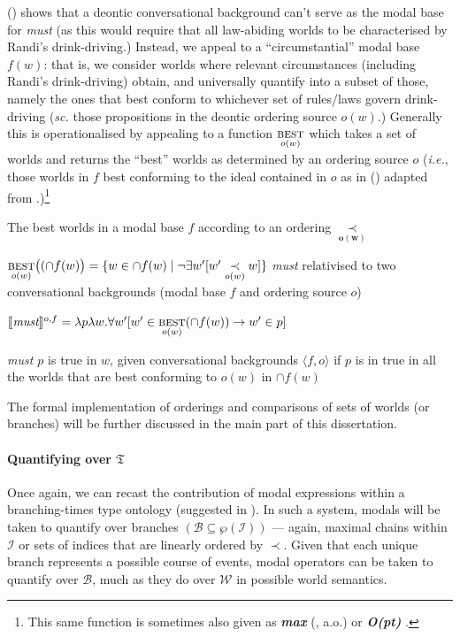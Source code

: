 \documentclass[12pt,dvipsnames]{report}
\providecommand{\denote}[2][]{\ensuremath{\llbracket{#2}\rrbracket^{#1}}}
\begin{document}
\noindent(\lastx) shows that a deontic conversational background can't serve as the modal base for \textit{must} (as this would require that all law-abiding worlds to be characterised by Randi's drink-driving.) Instead, we appeal to a ``circumstantial'' modal base $ f(w) $: that is, we consider worlds where relevant circumstances (including Randi's drink-driving) obtain, and universally quantify into a subset of those, namely the ones that best conform to whichever set of rules/laws govern drink-driving (\textit{sc.} those propositions in the deontic ordering source $ o(w) $.) Generally this is operationalised by appealing to a function $ \underset{o(w)}{\textsc{best}}$ which takes a set of worlds and returns the ``best'' worlds as determined by an ordering source $ o $ (\textit{i.e.}, those worlds in $ f $ best conforming to the ideal contained in $ o $ as in (\nextx) adapted from \citealp[61]{VonFintel2011}.)\footnote{This same function is sometimes also given as \textbf{\textit{max}} (\citealp[e.g.][]{Hacquard2006,VonFintel2008,VonFintel2011}, a.o.) or \textbf{\textit{O(pt)}} \citep[247]{Schwager2006}.} 

\ex The best worlds in a modal base $ f $ according to an ordering $\boldsymbol{\underset{o(w)}{\prec}}$

$ \underset{o(w)}{\textsc{best}}\big((\cap f(w)\big)=\{w\in\cap f(w)\mid \neg\exists w'[w'\underset{o(w)}{\prec}w]\}$\label{ord-source}\xe
\pex \textit{must} relativised to two conversational backgrounds (modal base $ f $ and ordering source $ o $)

$\denote[o,f]{\textit{must}}=\lambda p\lambda w.\forall w'[w'\in\underset{o(w)}{\textsc{best}}(\cap f(w))\to w'\in p] $

\textit{must $ p $} is true in $ w $, given conversational backgrounds $ \langle{f,o}\rangle $ if $ p $ is in true in all the worlds that are best conforming to $ o(w) $ in $ \cap f(w) $
\xe





The formal implementation of orderings and comparisons of sets of worlds (or branches) will be further discussed in the main part of this dissertation.

\paragraph{Quantifying over $ \mathfrak{T} $}

Once again, we can recast the contribution of modal expressions within a branching-times type ontology (suggested in \citealp[594, note 9]{VonPrince2019}). In such a system, modals will be taken to quantify over branches $ (\mathcal{B\subseteq\wp(I)})$ --- again, maximal chains within $ \mathcal I $ or sets of indices that are linearly ordered by $ \prec $. Given that each unique branch represents a possible course of events, modal operators can be taken to quantify over $ \mathcal B $, much as they do over $ \mathcal W $ in possible world semantics.
\end{document}
